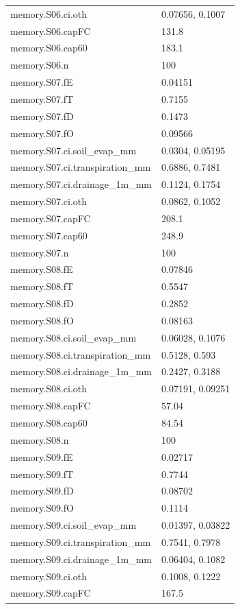 {\begin{longtable}{p{}p{}}
{}memory.S06.ci.oth & 0.07656, 0.1007\\
{}memory.S06.capFC & 131.8\\
{}memory.S06.cap60 & 183.1\\
{}memory.S06.n & 100\\
{}memory.S07.fE & 0.04151\\
{}memory.S07.fT & 0.7155\\
{}memory.S07.fD & 0.1473\\
{}memory.S07.fO & 0.09566\\
{}memory.S07.ci.soil\_evap\_mm & 0.0304, 0.05195\\
{}memory.S07.ci.transpiration\_mm & 0.6886, 0.7481\\
{}memory.S07.ci.drainage\_1m\_mm & 0.1124, 0.1754\\
{}memory.S07.ci.oth & 0.0862, 0.1052\\
{}memory.S07.capFC & 208.1\\
{}memory.S07.cap60 & 248.9\\
{}memory.S07.n & 100\\
{}memory.S08.fE & 0.07846\\
{}memory.S08.fT & 0.5547\\
{}memory.S08.fD & 0.2852\\
{}memory.S08.fO & 0.08163\\
{}memory.S08.ci.soil\_evap\_mm & 0.06028, 0.1076\\
{}memory.S08.ci.transpiration\_mm & 0.5128, 0.593\\
{}memory.S08.ci.drainage\_1m\_mm & 0.2427, 0.3188\\
{}memory.S08.ci.oth & 0.07191, 0.09251\\
{}memory.S08.capFC & 57.04\\
{}memory.S08.cap60 & 84.54\\
{}memory.S08.n & 100\\
{}memory.S09.fE & 0.02717\\
{}memory.S09.fT & 0.7744\\
{}memory.S09.fD & 0.08702\\
{}memory.S09.fO & 0.1114\\
{}memory.S09.ci.soil\_evap\_mm & 0.01397, 0.03822\\
{}memory.S09.ci.transpiration\_mm & 0.7541, 0.7978\\
{}memory.S09.ci.drainage\_1m\_mm & 0.06404, 0.1082\\
{}memory.S09.ci.oth & 0.1008, 0.1222\\
{}memory.S09.capFC & 167.5\\

\end{longtable}}
